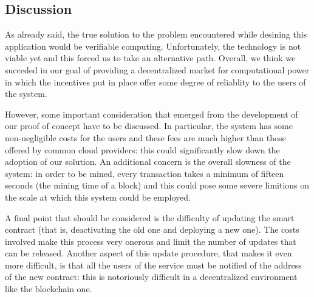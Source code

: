 \subsection{Discussion}
As already said, the true solution to the problem encountered while desining this application would be verifiable computing. Unfortunately, the technology is not viable yet and this forced us to take an alternative path. Overall, we think we succeded in our goal of providing a decentralized market for computational power in which the incentives put in place offer some degree of reliablity to the users of the system.

However, some important consideration that emerged from the development of our proof of concept have to be discussed. In particular, the system has some non-negligible costs for the users and these fees are much higher than those offered by common cloud providers: this could significantly slow down the adoption of our solution. An additional concern is the overall slowness of the system: in order to be mined, every transaction takes a minimum of fifteen seconds (the mining time of a block) and this could pose some severe limitions on the scale at which this system could be employed.

A final point that should be considered is the difficulty of updating the smart contract (that is, deactivating the old one and deploying a new one). The costs involved make this process very onerous and limit the number of updates that can be released. Another aspect of this update procedure, that makes it even more difficult, is that all the users of the service must be notified of the address of the new contract: this is notoriously difficult in a decentralized environment like the blockchain one.
